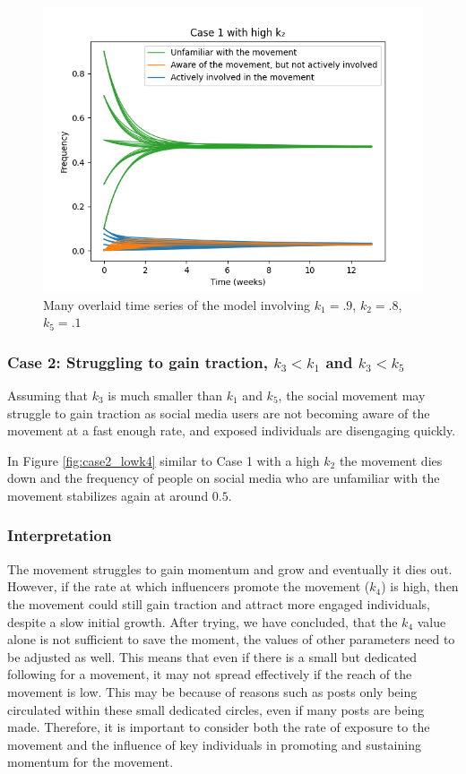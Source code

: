\documentclass{article}
\begin{document}
    \begin{figure}[H]

        \centering
        \includegraphics[width=\textwidth]{simulation/plots/case1-highk2.png}   
        \caption{Many overlaid time series of the model involving \mbox{$k_1=.9$}, \mbox{$k_2=.8$}, \mbox{$k_5=.1$}}
        \label{fig:case1_highk2}
    \end{figure}


    \subsubsection*{Case 2: Struggling to gain traction, $k_3 < k_1$ and $k_3 < k_5$}
    Assuming that $k_3$ is much smaller than $k_1$ and $k_5$, the social movement may struggle to gain traction as social media users are not becoming aware of the movement at a fast enough rate, and exposed individuals are disengaging quickly. 

    In Figure \ref{fig:case2_lowk4} similar to Case 1 with a high $k_2$ the movement dies down and the frequency of people on social media who are unfamiliar with the movement stabilizes again at around $0.5$.
    
    \subsubsection*{Interpretation} The movement struggles to gain momentum and grow and eventually it dies out. However, if the rate at which influencers promote the movement ($k_4$) is high, then the movement could still gain traction and attract more engaged individuals, despite a slow initial growth. After trying, we have concluded, that the $k_4$ value alone is not sufficient to save the moment, the values of other parameters need to be adjusted as well. This means that even if there is a small but dedicated following for a movement, it may not spread effectively if the reach of the movement is low. This may be because of reasons such as posts only being circulated within these small dedicated circles, even if many posts are being made. Therefore, it is important to consider both the rate of exposure to the movement and the influence of key individuals in promoting and sustaining momentum for the movement. 
    
\end{document}
